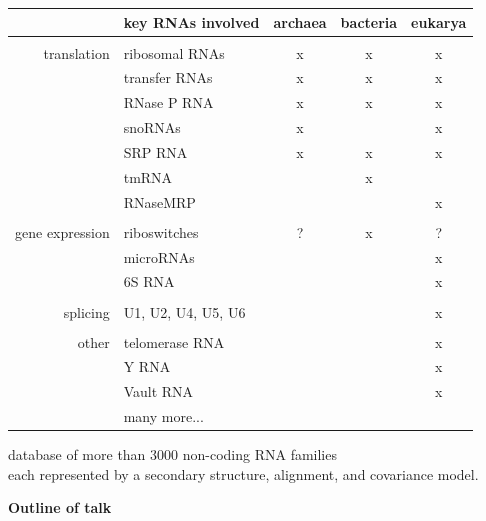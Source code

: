 \documentclass[landscape]{slides}
\begin{document}
\begin{slide}
\begin{slide}
\small
\begin{center}
\begin{tabular}{r|l|ccc}
 & key RNAs involved & archaea & bacteria & eukarya \\ \hline
 & \\ 
translation & ribosomal RNAs & x & x & x \\
            & transfer RNAs  & x & x & x \\
            & RNase P RNA    & x & x & x \\
            & snoRNAs        & x &   & x \\ 
            & SRP RNA        & x & x & x \\ 
            & tmRNA          &   & x &   \\ 
            & RNaseMRP       &   &   & x \\ 
            &  \\ 
gene expression & riboswitches & ? & x & ? \\
                & microRNAs &  & & x \\
                & 6S RNA & & & x\\ 
                & \\ 
splicing        & U1, U2, U4, U5, U6 & & & x \\ 
                & \\
other           & telomerase RNA & & & x \\ 
                & Y RNA          & & & x \\
                & Vault RNA      & & & x \\
                & many more... & & & \\ 
\end{tabular}



database of more than 3000 non-coding RNA families \\ each represented by a
secondary structure, alignment, and covariance model.
\end{center}

\vfill
\end{slide}
\begin{slide}
\begin{center}
\textbf{Outline of talk}


\end{center}
\end{slide}
\end{slide}
\end{document}
